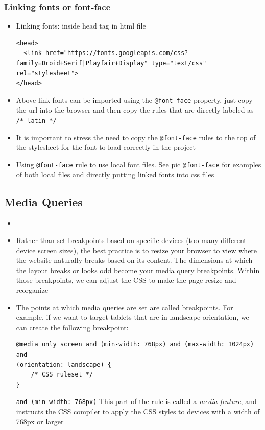 \documentclass[a4paper, 12pt]{article}
\begin{document}
\subsubsection{Linking fonts or font-face}
\begin{itemize}
\item Linking fonts: inside head tag in html file
\begin{verbatim}
<head>
  <link href="https://fonts.googleapis.com/css?family=Droid+Serif|Playfair+Display" type="text/css" rel="stylesheet">
</head>
\end{verbatim}

\item Above link fonts can be imported using the \verb|@font-face| property, just copy the url into the browser and then copy the rules that are directly labeled as \verb|/* latin */|

\item It is important to stress the need to copy the \verb|@font-face| rules to the top of the stylesheet for the font to load correctly in the project

\item Using \verb|@font-face| rule to use local font files. See pic \verb|@font-face| for examples of both local files and directly putting linked fonts into css files
\end{itemize}



\subsection{Media Queries}
\begin{itemize}
\item 

\item Rather than set breakpoints based on specific devices (too many different device screen sizes), the best practice is to resize your browser to view where the website naturally breaks based on its content. The dimensions at which the layout breaks or looks odd become your media query breakpoints. Within those breakpoints, we can adjust the CSS to make the page resize and reorganize

\item The points at which media queries are set are called breakpoints. For example, if we want to target tablets that are in landscape orientation, we can create the following breakpoint:
\begin{verbatim}
@media only screen and (min-width: 768px) and (max-width: 1024px) and 
(orientation: landscape) {
    /* CSS ruleset */
}
\end{verbatim}
\verb|and (min-width: 768px)| \textemdash This part of the rule is called a \textit{media feature}, and instructs the CSS compiler to apply the CSS styles to devices with a width of 768px or larger

\end{itemize}
\end{document}
